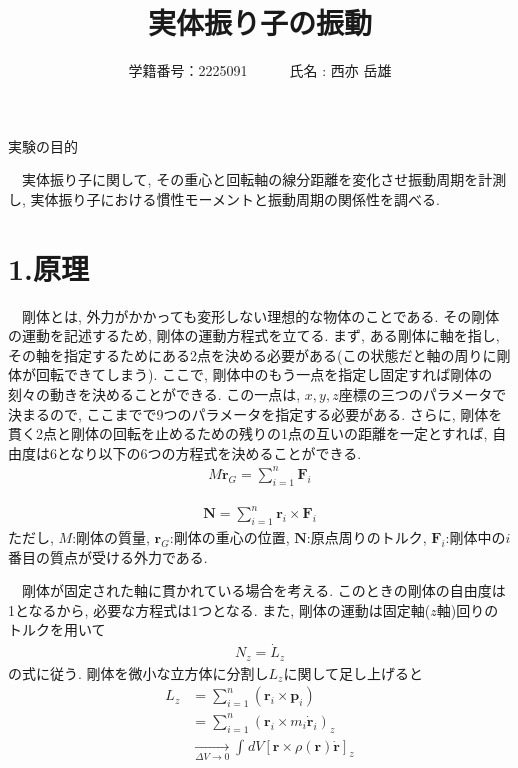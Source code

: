 \documentclass[a4paper,12pt]{jlreq}
\title{実体振り子の振動}
\author{学籍番号：2225091~~~~~~氏名 : 西亦 岳雄}
\begin{document}
\maketitle

\begin{itembox}[l]{\large 実験の目的}

　実体振り子に関して, その重心と回転軸の線分距離を変化させ振動周期を計測し, 実体振り子における慣性モーメントと振動周期の関係性を調べる.

\end{itembox}


\section*{1.原理}

　剛体とは, 外力がかかっても変形しない理想的な物体のことである. その剛体の運動を記述するため, 剛体の運動方程式を立てる. まず, ある剛体に軸を指し, その軸を指定するためにある2点を決める必要がある(この状態だと軸の周りに剛体が回転できてしまう). ここで, 剛体中のもう一点を指定し固定すれば剛体の刻々の動きを決めることができる. この一点は, $x,y,z$座標の三つのパラメータで決まるので, ここまでで9つのパラメータを指定する必要がある. さらに, 剛体を貫く2点と剛体の回転を止めるための残りの1点の互いの距離を一定とすれば, 自由度は6となり以下の6つの方程式を決めることができる. 
\begin{align}
    M \ddot{\bm{r}}_G = \sum_{i=1}^{n} \bm{F}_i
\end{align}

\begin{align}
\bm{N} = \sum_{i=1}^{n} \bm{r}_i \times \bm{F}_i  
\end{align}
ただし, $M$:剛体の質量, $\bm{r}_G$:剛体の重心の位置, $\bm{N}$:原点周りのトルク, $\bm{F}_i$:剛体中の$i$番目の質点が受ける外力である. 

　剛体が固定された軸に貫かれている場合を考える. このときの剛体の自由度は1となるから, 必要な方程式は1つとなる. また, 剛体の運動は固定軸($z$軸)回りのトルクを用いて
\begin{align}
    N_z = \dot{L}_z
\end{align}
の式に従う. 剛体を微小な立方体に分割し$L_z$に関して足し上げると
\begin{align}
    L_z &= \sum_{i=1}^{n} (\bm{r}_i \times \bm{p}_i)\\
        &= \sum_{i=1}^{n} (\bm{r}_i \times m_i \dot{\bm{r}}_i)_z\\
        &\xrightarrow[\Delta V \to 0]{} \int_{}^{} dV[\bm{r} \times \rho(\bm{r})\dot{\bm{r}}]_z
\end{align}
\end{document}
